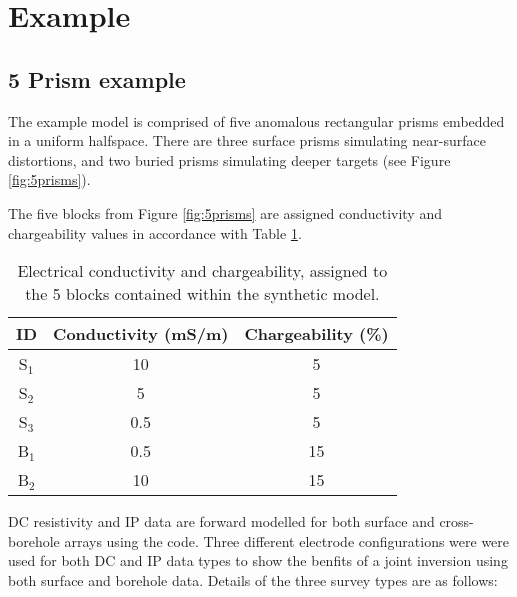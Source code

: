 \section{Example}

\subsection{5 Prism example}

The example model is comprised of five anomalous rectangular prisms embedded in a uniform halfspace. There are three surface prisms simulating near-surface distortions, and two buried prisms simulating deeper targets (see Figure \ref{fig:5prisms}). 

The five blocks from Figure \ref{fig:5prisms} are assigned conductivity and chargeability values in accordance with Table \ref{tabl:properties}.

\begin{table}[ht]
\centering
\begin{tabular}{|c|c|c|}
\hline
ID & Conductivity (mS/m) & Chargeability (\%) \\
\hline
S$_1$ & 10 & 5 \\
\hline
S$_2$ & 5 & 5 \\
\hline
S$_3$ & 0.5 & 5 \\
\hline
B$_1$ & 0.5 & 15 \\
\hline
B$_2$ & 10 & 15 \\
\hline
\end{tabular}
\caption{Electrical conductivity and chargeability, assigned to the 5 blocks contained within the synthetic model.}
\label{tabl:properties}
\end{table}

DC resistivity and IP data are forward modelled for both surface and cross-borehole arrays using the  code. Three different electrode configurations were were used for both DC and IP data types to show the benfits of a joint inversion using both surface and borehole data. Details of the three survey types are as follows:  

